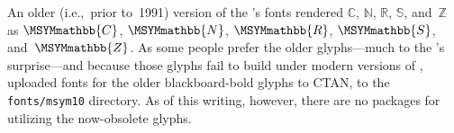 \begin{center}
\ifx\MSYMmathbb\undefined\else
\bigskip
\begin{tablenote}[\S]
  An older (i.e.,~prior to~1991) version of the \AMS's fonts rendered
  $\mathbb{C}$, $\mathbb{N}$, $\mathbb{R}$, $\mathbb{S}$,
  and~$\mathbb{Z}$ as $\MSYMmathbb{C}$, $\MSYMmathbb{N}$,
  $\MSYMmathbb{R}$, $\MSYMmathbb{S}$, and~$\MSYMmathbb{Z}$.  As some
  people prefer the older glyphs---much to the \AMS's surprise---and
  because those glyphs fail to build under modern versions of
  \metafont,  uploaded \postscript fonts for
  the older blackboard-bold glyphs to CTAN\idxCTAN{}, to the
  \texttt{fonts/msym10} directory.  As of this writing, however, there
  are no \latexE packages for utilizing the now-obsolete glyphs.
\end{tablenote}
\fi
\end{center}


%
%
%


